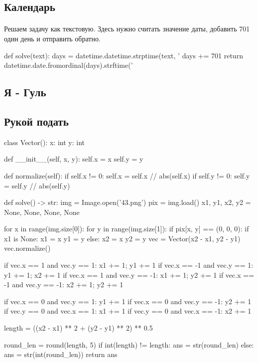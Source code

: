 \documentclass[12pt]{article}
\begin{document}

    \subsection{Календарь}
    \paragraph{}
    Решаем задачу как текстовую.
    Здесь нужно считать значение даты, добавить 701 один день и отправить обратно.
    \begin{pythoncode}
def solve(text):
    days = datetime.datetime.strptime(text, '%
    days += 701
    return datetime.date.fromordinal(days).strftime('%
    \end{pythoncode}

    \subsection{Я - Гуль}


    \subsection{Рукой подать}

    \begin{pythoncode}
class Vector():
    x: int
    y: int

    def __init__(self, x, y):
        self.x = x
        self.y = y

    def normalize(self):
        if self.x != 0: self.x = self.x // abs(self.x)
        if self.y != 0: self.y = self.y // abs(self.y)

def solve() -> str:
    img = Image.open('43.png')
    pix = img.load()
    x1, y1, x2, y2 = None, None, None, None

    for x in range(img.size[0]):
        for y in range(img.size[1]):
            if pix[x, y] == (0, 0, 0):
                if x1 is None:
                    x1 = x
                    y1 = y
                else:
                    x2 = x
                    y2 = y
    vec = Vector(x2 - x1, y2 - y1)
    vec.normalize()

    if vec.x == 1 and vec.y == 1: x1 += 1; y1 += 1
    if vec.x == -1 and vec.y == 1: y1 += 1; x2 += 1
    if vec.x == 1 and vec.y == -1: x1 += 1; y2 += 1
    if vec.x == -1 and vec.y == -1: x2 += 1; y2 += 1

    if vec.x == 0 and vec.y == 1: y1 += 1
    if vec.x == 0 and vec.y == -1: y2 += 1
    if vec.y == 0 and vec.x == 1: x1 += 1
    if vec.y == 0 and vec.x == -1: x2 += 1

    length = ((x2 - x1) ** 2 + (y2 - y1) ** 2) ** 0.5

    round_len = round(length, 5)
    if int(length) != length:
        ans = str(round_len)
    else:
        ans = str(int(round_len))
    return ans
    \end{pythoncode}
\end{document}
